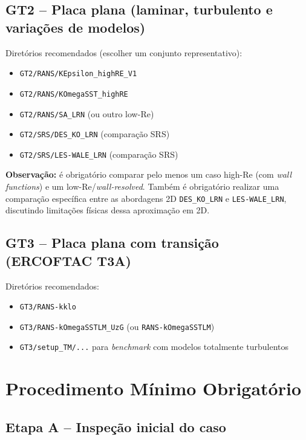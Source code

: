 \documentclass[12pt,a4paper]{article}
\begin{document}
\subsection*{GT2 -- Placa plana (laminar, turbulento e variações de modelos)}

Diretórios recomendados (escolher um conjunto representativo):
\begin{itemize}
  \item \texttt{GT2/RANS/KEpsilon\_highRE\_V1}
  \item \texttt{GT2/RANS/KOmegaSST\_highRE}
  \item \texttt{GT2/RANS/SA\_LRN} (ou outro low-Re)
  \item \texttt{GT2/SRS/DES\_KO\_LRN} (comparação SRS)
  \item \texttt{GT2/SRS/LES-WALE\_LRN} (comparação SRS)
\end{itemize}

\textbf{Observação:} é obrigatório comparar pelo menos um caso high-Re (com \textit{wall functions}) e um low-Re/\textit{wall-resolved}. Também é obrigatório realizar uma comparação específica entre as abordagens 2D \texttt{DES\_KO\_LRN} e \texttt{LES-WALE\_LRN}, discutindo limitações físicas dessa aproximação em 2D.

\subsection*{GT3 -- Placa plana com transição (ERCOFTAC T3A)}

Diretórios recomendados:
\begin{itemize}
  \item \texttt{GT3/RANS-kklo}
  \item \texttt{GT3/RANS-kOmegaSSTLM\_UzG} (ou \texttt{RANS-kOmegaSSTLM})
  \item \texttt{GT3/setup\_TM/...} para \textit{benchmark} com modelos totalmente turbulentos
\end{itemize}

\section{Procedimento Mínimo Obrigatório}

\subsection{Etapa A -- Inspeção inicial do caso}
\end{document}
